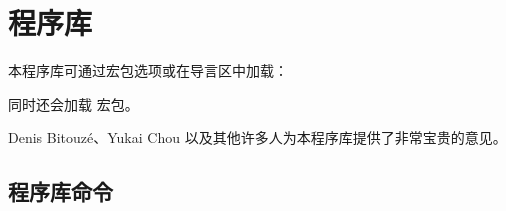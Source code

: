 \clearpage
\section{ 程序库}\label{sec:theorems}%
%
本程序库可通过宏包选项或在导言区中加载：
\begin{dispListing}
\end{dispListing}
同时还会加载  宏包。

Denis Bitouz\'e、Yukai Chou 以及其他许多人为本程序库提供了非常宝贵的意见。


\subsection{程序库命令}


